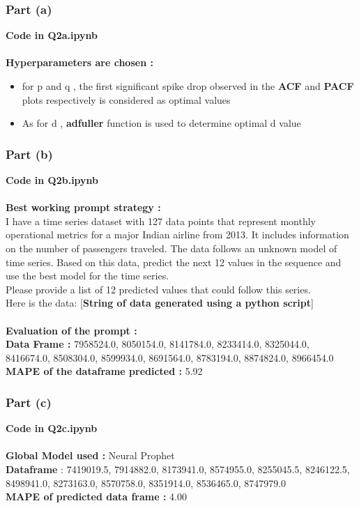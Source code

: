\documentclass[12pt]{article}
\begin{document}
\subsubsection{Part (a)}
\textbf{Code in Q2a.ipynb}\\
\\
\textbf{Hyperparameters are chosen : }
\begin{itemize}
    \item for p and q , the first significant spike drop observed in the \textbf{ACF} and \textbf{PACF} plots respectively is considered as optimal values
    \item As for d , \textbf{adfuller} function is used to determine optimal d value
\end{itemize}
\subsubsection{Part (b)}
\textbf{Code in Q2b.ipynb}\\
\\
\textbf{Best working prompt strategy : }\\
I have a time series dataset with 127 data points that represent monthly operational metrics for a major Indian airline from 2013. It includes information on the number of passengers traveled. The data follows an unknown model of time series. Based on this data, predict the next 12 values in the sequence and use the best model for the time series.\\
Please provide a list of 12 predicted values that could follow this series.\\
Here is the data: [\textbf{String of data generated using a python script}]\\
\\
\textbf{Evaluation of the prompt : }\\
\textbf{Data Frame : }7958524.0, 8050154.0, 8141784.0, 8233414.0, 8325044.0, 8416674.0, 8508304.0, 8599934.0, 8691564.0, 8783194.0, 8874824.0, 8966454.0\\
\textbf{MAPE of the dataframe predicted : }5.92
\subsubsection{Part (c)}
\textbf{Code in Q2c.ipynb}\\
\\
\textbf{Global Model used : }Neural Prophet\\
\textbf{Dataframe} : 7419019.5, 7914882.0, 8173941.0, 8574955.0, 8255045.5, 8246122.5, 8498941.0, 8273163.0, 8570758.0, 8351914.0, 8536465.0, 8747979.0\\
\textbf{MAPE of predicted data frame : }4.00
\end{document}
